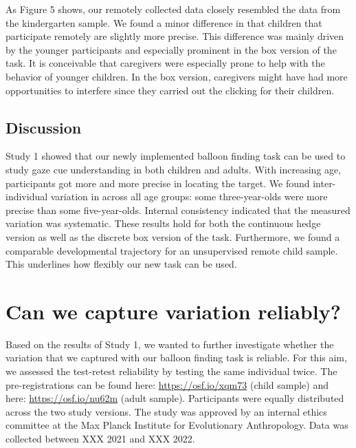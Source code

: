 \documentclass[
  man,floatsintext]{apa6}
\begin{document}
As Figure 5 shows, our remotely collected data closely resembled the data from the kindergarten sample. We found a minor difference in that children that participate remotely are slightly more precise. This difference was mainly driven by the younger participants and especially prominent in the box version of the task. It is conceivable that caregivers were especially prone to help with the behavior of younger children. In the box version, caregivers might have had more opportunities to interfere since they carried out the clicking for their children.







\hypertarget{discussion-1}{%
\subsection{Discussion}\label{discussion-1}}

Study 1 showed that our newly implemented balloon finding task can be used to study gaze cue understanding in both children and adults. With increasing age, participants got more and more precise in locating the target. We found inter-individual variation in across all age groups: some three-year-olds were more precise than some five-year-olds. Internal consistency indicated that the measured variation was systematic. These results hold for both the continuous hedge version as well as the discrete box version of the task. Furthermore, we found a comparable developmental trajectory for an unsupervised remote child sample. This underlines how flexibly our new task can be used.

\hypertarget{can-we-capture-variation-reliably}{%
\section{Can we capture variation reliably?}\label{can-we-capture-variation-reliably}}

Based on the results of Study 1, we wanted to further investigate whether the variation that we captured with our balloon finding task is reliable. For this aim, we assessed the test-retest reliability by testing the same individual twice. The pre-registrations can be found here: \url{https://osf.io/xqm73} (child sample) and here: \url{https://osf.io/nu62m} (adult sample). Participants were equally distributed across the two study versions. The study was approved by an internal ethics committee at the Max Planck Institute for Evolutionary Anthropology. Data was collected between XXX 2021 and XXX 2022.
\end{document}
